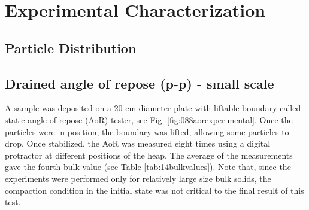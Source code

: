 
\chapter[Experimental Characterization]{Experimental Characterization}
\label{cap:experimentalcharacterization}









\section{Particle Distribution}
\label{sec:particledistribution}


\section{Drained angle of repose (p-p) - small scale}
\label{sec:aor}

A sample was deposited on a 20 cm diameter plate with liftable
boundary called static angle of repose (\acs{AoR}) tester, see Fig. \ref{fig:088aorexperimental}.
Once the particles were in position, the boundary was lifted, allowing some particles to drop. 
Once stabilized, the \acs{AoR} was measured eight times using a digital protractor at different positions of the heap. 
The average of the measurements gave the fourth bulk value (see Table
\ref{tab:14bulkvalues}).
Note that, since the experiments were performed only for relatively large size
bulk solids, the compaction condition in the initial state was not critical to the
final result of this test.\\


